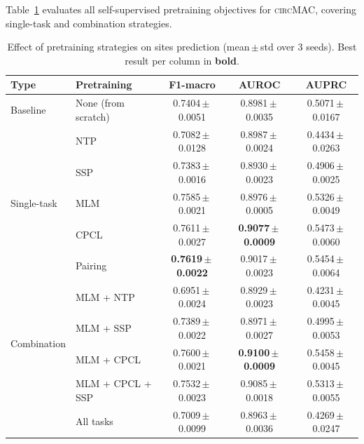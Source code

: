 \documentclass[11pt]{article}
\newcommand{\model}{\textsc{circMAC}}
\newcommand{\best}[1]{\textbf{#1}}
\newcommand{\spm}{\,\ensuremath{\pm}\,}
\begin{document}
Table~\ref{tab:pretrain} evaluates all self-supervised pretraining
objectives for \model{}, covering single-task and combination strategies.

\begin{table}[htbp]
\centering
\caption{Effect of pretraining strategies on sites prediction
         (mean\,$\pm$\,std over 3 seeds).
         Best result per column in \textbf{bold}.}
\label{tab:pretrain}
\renewcommand{\arraystretch}{1.15}
\begin{tabular}{llccc}
\toprule
\textbf{Type} & \textbf{Pretraining} & \textbf{F1-macro} & \textbf{AUROC} & \textbf{AUPRC} \\
\midrule
Baseline  & None (from scratch)  & 0.7404\spm 0.0051 & 0.8981\spm 0.0035 & 0.5071\spm 0.0167 \\
\midrule
\multirow{5}{*}{Single-task}
  & NTP                & 0.7082\spm 0.0128 & 0.8987\spm 0.0024 & 0.4434\spm 0.0263 \\
  & SSP                & 0.7383\spm 0.0016 & 0.8930\spm 0.0023 & 0.4906\spm 0.0025 \\
  & MLM                & 0.7585\spm 0.0021 & 0.8976\spm 0.0005 & 0.5326\spm 0.0049 \\
  & CPCL               & 0.7611\spm 0.0027 & \best{0.9077\spm 0.0009} & 0.5473\spm 0.0060 \\
  & Pairing            & \best{0.7619\spm 0.0022} & 0.9017\spm 0.0023 & 0.5454\spm 0.0064 \\
\midrule
\multirow{4}{*}{Combination}
  & MLM + NTP          & 0.6951\spm 0.0024 & 0.8929\spm 0.0023 & 0.4231\spm 0.0045 \\
  & MLM + SSP          & 0.7389\spm 0.0022 & 0.8971\spm 0.0027 & 0.4995\spm 0.0053 \\
  & MLM + CPCL         & 0.7600\spm 0.0021 & \best{0.9100\spm 0.0009} & 0.5458\spm 0.0045 \\
  & MLM + CPCL + SSP   & 0.7532\spm 0.0023 & 0.9085\spm 0.0018 & 0.5313\spm 0.0055 \\
  & All tasks          & 0.7009\spm 0.0099 & 0.8963\spm 0.0036 & 0.4269\spm 0.0247 \\
\bottomrule
\end{tabular}
\end{table}
\end{document}
